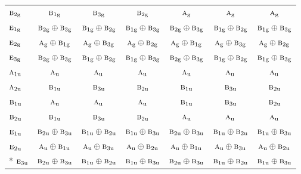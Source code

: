 \documentclass[10pt,a4paper]{article}
\numberwithin{equation}{section}
\newcommand{\irr}[1]{\text{\normalfont\scshape #1}}
\newcommand{\ptag}[1]{\mathrm{#1}}
\begin{document}
{\begin{longtable}{@{}lcccccc@{}}
$\irr{b}_{2\ptag{g}}$ & $\irr{b}_{1\ptag{g}}$ & $\irr{b}_{3\ptag{g}}$ & $\irr{b}_{2\ptag{g}}$ & $\irr{a}_{\ptag{g}}$ & $\irr{a}_{\ptag{g}}$ & $\irr{a}_{\ptag{g}}$\\
$\irr{e}_{1\ptag{g}}$ & $\irr{b}_{2\ptag{g}}\oplus \irr{b}_{3\ptag{g}}$ & $\irr{b}_{1\ptag{g}}\oplus \irr{b}_{2\ptag{g}}$ & $\irr{b}_{1\ptag{g}}\oplus \irr{b}_{3\ptag{g}}$ & $\irr{b}_{2\ptag{g}}\oplus \irr{b}_{3\ptag{g}}$ & $\irr{b}_{1\ptag{g}}\oplus \irr{b}_{2\ptag{g}}$ & $\irr{b}_{1\ptag{g}}\oplus \irr{b}_{3\ptag{g}}$\\
$\irr{e}_{2\ptag{g}}$ & $\irr{a}_{\ptag{g}}\oplus \irr{b}_{1\ptag{g}}$ & $\irr{a}_{\ptag{g}}\oplus \irr{b}_{3\ptag{g}}$ & $\irr{a}_{\ptag{g}}\oplus \irr{b}_{2\ptag{g}}$ & $\irr{a}_{\ptag{g}}\oplus \irr{b}_{1\ptag{g}}$ & $\irr{a}_{\ptag{g}}\oplus \irr{b}_{3\ptag{g}}$ & $\irr{a}_{\ptag{g}}\oplus \irr{b}_{2\ptag{g}}$\\
$\irr{e}_{3\ptag{g}}$ & $\irr{b}_{2\ptag{g}}\oplus \irr{b}_{3\ptag{g}}$ & $\irr{b}_{1\ptag{g}}\oplus \irr{b}_{2\ptag{g}}$ & $\irr{b}_{1\ptag{g}}\oplus \irr{b}_{3\ptag{g}}$ & $\irr{b}_{2\ptag{g}}\oplus \irr{b}_{3\ptag{g}}$ & $\irr{b}_{1\ptag{g}}\oplus \irr{b}_{2\ptag{g}}$ & $\irr{b}_{1\ptag{g}}\oplus \irr{b}_{3\ptag{g}}$\\
$\irr{a}_{1\ptag{u}}$ & $\irr{a}_{\ptag{u}}$ & $\irr{a}_{\ptag{u}}$ & $\irr{a}_{\ptag{u}}$ & $\irr{a}_{\ptag{u}}$ & $\irr{a}_{\ptag{u}}$ & $\irr{a}_{\ptag{u}}$\\
$\irr{a}_{2\ptag{u}}$ & $\irr{b}_{1\ptag{u}}$ & $\irr{b}_{3\ptag{u}}$ & $\irr{b}_{2\ptag{u}}$ & $\irr{b}_{1\ptag{u}}$ & $\irr{b}_{3\ptag{u}}$ & $\irr{b}_{2\ptag{u}}$\\
$\irr{b}_{1\ptag{u}}$ & $\irr{a}_{\ptag{u}}$ & $\irr{a}_{\ptag{u}}$ & $\irr{a}_{\ptag{u}}$ & $\irr{b}_{1\ptag{u}}$ & $\irr{b}_{3\ptag{u}}$ & $\irr{b}_{2\ptag{u}}$\\
$\irr{b}_{2\ptag{u}}$ & $\irr{b}_{1\ptag{u}}$ & $\irr{b}_{3\ptag{u}}$ & $\irr{b}_{2\ptag{u}}$ & $\irr{a}_{\ptag{u}}$ & $\irr{a}_{\ptag{u}}$ & $\irr{a}_{\ptag{u}}$\\
$\irr{e}_{1\ptag{u}}$ & $\irr{b}_{2\ptag{u}}\oplus \irr{b}_{3\ptag{u}}$ & $\irr{b}_{1\ptag{u}}\oplus \irr{b}_{2\ptag{u}}$ & $\irr{b}_{1\ptag{u}}\oplus \irr{b}_{3\ptag{u}}$ & $\irr{b}_{2\ptag{u}}\oplus \irr{b}_{3\ptag{u}}$ & $\irr{b}_{1\ptag{u}}\oplus \irr{b}_{2\ptag{u}}$ & $\irr{b}_{1\ptag{u}}\oplus \irr{b}_{3\ptag{u}}$\\
$\irr{e}_{2\ptag{u}}$ & $\irr{a}_{\ptag{u}}\oplus \irr{b}_{1\ptag{u}}$ & $\irr{a}_{\ptag{u}}\oplus \irr{b}_{3\ptag{u}}$ & $\irr{a}_{\ptag{u}}\oplus \irr{b}_{2\ptag{u}}$ & $\irr{a}_{\ptag{u}}\oplus \irr{b}_{1\ptag{u}}$ & $\irr{a}_{\ptag{u}}\oplus \irr{b}_{3\ptag{u}}$ & $\irr{a}_{\ptag{u}}\oplus \irr{b}_{2\ptag{u}}$\\*
$\irr{e}_{3\ptag{u}}$ & $\irr{b}_{2\ptag{u}}\oplus \irr{b}_{3\ptag{u}}$ & $\irr{b}_{1\ptag{u}}\oplus \irr{b}_{2\ptag{u}}$ & $\irr{b}_{1\ptag{u}}\oplus \irr{b}_{3\ptag{u}}$ & $\irr{b}_{2\ptag{u}}\oplus \irr{b}_{3\ptag{u}}$ & $\irr{b}_{1\ptag{u}}\oplus \irr{b}_{2\ptag{u}}$ & $\irr{b}_{1\ptag{u}}\oplus \irr{b}_{3\ptag{u}}$\\
\bottomrule\end{longtable}}
\end{document}
